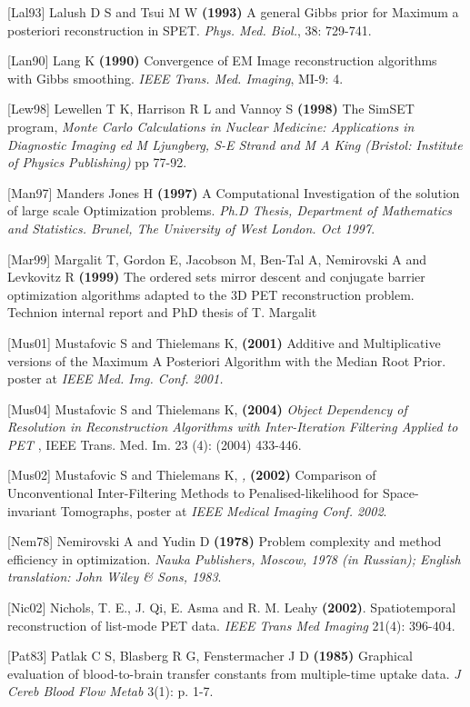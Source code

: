 \documentclass{article}
\begin{document}
{[}Lal93] Lalush D S and Tsui M W \textbf{(1993)} A general Gibbs prior 
for Maximum a posteriori reconstruction in SPET. \textit{Phys. Med. 
Biol.}, 38: 729-741.

{[}Lan90] Lang K \textbf{(1990)} Convergence of EM Image reconstruction 
algorithms with Gibbs smoothing. \textit{IEEE Trans. Med. Imaging}, 
MI-9: 4.

{[Lew98] Lewellen T K, Harrison R L and Vannoy S \textbf{(1998)} 
The SimSET program,
\textit{ Monte Carlo Calculations in Nuclear Medicine:
Applications in Diagnostic Imaging ed M Ljungberg, S-E Strand and M A King (Bristol: Institute of Physics
Publishing)} pp 77-92.

{[}Man97] Manders Jones H \textbf{(1997)} A Computational Investigation 
of the solution of large scale Optimization problems. \textit{Ph.D 
Thesis, Department of Mathematics and Statistics. Brunel, The 
University of West London. Oct 1997}.


{[}Mar99] Margalit T, Gordon E, Jacobson M, Ben-Tal A, Nemirovski 
A and Levkovitz R \textbf{(1999)} The ordered sets mirror descent and 
conjugate barrier optimization algorithms adapted to the 3D PET 
reconstruction problem. Technion internal report and PhD thesis of T. Margalit

{[}Mus01] Mustafovic S and Thielemans K, \textbf{(2001)} Additive and Multiplicative 
versions of the Maximum A Posteriori Algorithm with the Median 
Root Prior. poster at \textit{IEEE Med. Img. Conf. 2001.}

{[}Mus04] Mustafovic S and Thielemans K, \textbf{(200}\textbf{4}\textbf{)} \textit{Object 
Dependency of Resolution in Reconstruction Algorithms with Inter-Iteration 
Filtering Applied to PET} , IEEE Trans. Med. Im. 23 (4): (2004) 
433-446.

{[}Mus02] Mustafovic S and Thielemans K, \textit{,} \textbf{(2002)}  Comparison 
of Unconventional Inter-Filtering Methods to Penalised-likelihood 
for Space-invariant Tomographs, poster at \textit{IEEE Medical Imaging 
Conf. 2002}.

{[}Nem78] Nemirovski A and Yudin D \textbf{(1978)} Problem complexity 
and method efficiency in optimization. \textit{Nauka Publishers, 
Moscow, 1978 (in Russian); English translation: John Wiley \& 
Sons, 1983}.

{[}Nic02] Nichols, T. E., J. Qi, E. Asma and R. M. Leahy \textbf{(2002)}. Spatiotemporal reconstruction of list-mode PET data.  \textit{IEEE Trans Med Imaging} 21(4): 396-404.

{[}Pat83] Patlak C S, Blasberg R G, Fenstermacher J D \textbf{(1985)}  Graphical evaluation of blood-to-brain 
transfer constants from multiple-time uptake data. \textit{J Cereb Blood Flow Metab} 3(1): p. 1-7.

}
\end{document}

